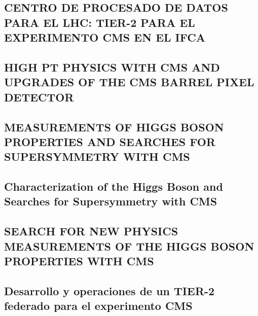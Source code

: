 \documentclass[a4paper, 11pt, twoside, openright]{report}
\begin{document}
\subsection{CENTRO DE PROCESADO DE DATOS PARA EL LHC: TIER-2 PARA EL EXPERIMENTO CMS EN EL IFCA}


\subsection{HIGH PT PHYSICS WITH CMS AND UPGRADES OF THE CMS BARREL PIXEL DETECTOR}


\subsection{MEASUREMENTS OF HIGGS BOSON PROPERTIES AND SEARCHES FOR SUPERSYMMETRY WITH CMS}


\subsection{Characterization of the Higgs Boson and Searches for Supersymmetry with CMS}


\subsection{SEARCH FOR NEW PHYSICS MEASUREMENTS OF THE HIGGS BOSON PROPERTIES WITH CMS}


\subsection{Desarrollo y operaciones de un TIER-2 federado para el experimento CMS}

\end{document}
